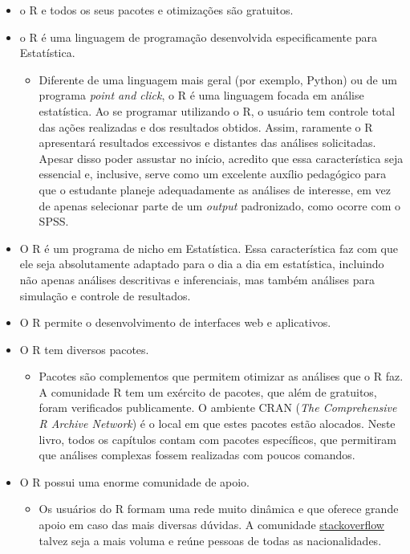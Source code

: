 \documentclass[
]{book}
\providecommand{\tightlist}{%
  \setlength{\itemsep}{0pt}\setlength{\parskip}{0pt}}
\begin{document}
\begin{itemize}
\item
  o R e todos os seus pacotes e otimizações são gratuitos.
\item
  o R é uma linguagem de programação desenvolvida especificamente para
  Estatística.

  \begin{itemize}
  \tightlist
  \item
    Diferente de uma linguagem mais geral (por exemplo, Python) ou de um
    programa \emph{point and click}, o R é uma linguagem focada em
    análise estatística. Ao se programar utilizando o R, o usuário tem
    controle total das ações realizadas e dos resultados obtidos. Assim,
    raramente o R apresentará resultados excessivos e distantes das
    análises solicitadas. Apesar disso poder assustar no início,
    acredito que essa característica seja essencial e, inclusive, serve
    como um excelente auxílio pedagógico para que o estudante planeje
    adequadamente as análises de interesse, em vez de apenas selecionar
    parte de um \emph{output} padronizado, como ocorre com o SPSS.
  \end{itemize}
\item
  O R é um programa de nicho em Estatística. Essa característica faz com
  que ele seja absolutamente adaptado para o dia a dia em estatística,
  incluindo não apenas análises descritivas e inferenciais, mas também
  análises para simulação e controle de resultados.
\item
  O R permite o desenvolvimento de interfaces web e aplicativos.
\item
  O R tem diversos pacotes.

  \begin{itemize}
  \tightlist
  \item
    Pacotes são complementos que permitem otimizar as análises que o R
    faz. A comunidade R tem um exército de pacotes, que além de
    gratuitos, foram verificados publicamente. O ambiente CRAN
    (\emph{The Comprehensive R Archive Network}) é o local em que estes
    pacotes estão alocados. Neste livro, todos os capítulos contam com
    pacotes específicos, que permitiram que análises complexas fossem
    realizadas com poucos comandos.
  \end{itemize}
\item
  O R possui uma enorme comunidade de apoio.

  \begin{itemize}
  \tightlist
  \item
    Os usuários do R formam uma rede muito dinâmica e que oferece grande
    apoio em caso das mais diversas dúvidas. A comunidade
    \href{https://stackoverflow.com/}{stackoverflow} talvez seja a mais
    voluma e reúne pessoas de todas as nacionalidades.
  \end{itemize}
\end{itemize}
\end{document}

